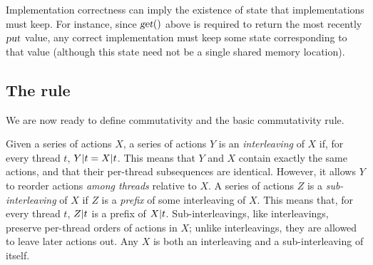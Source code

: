Implementation correctness can imply the existence of state
that implementations must keep.
%
For instance, since $\textsl{get}()$ above is required to return
the most recently $\textsl{put}$ value, any correct implementation must keep
some state corresponding to that value (although this state need not be
a single shared memory location).


\begin{comment}
\textbf{Nondeterminism.} We assume without loss of
generality${}^{\text{????}}$ that all operations have deterministic
return values. Of course, real operations often return nondeterministic
results. This can be modeled in various ways. For example, we might
model a nondeterministic action as returning a \emph{set} of values,
where the set contains all legal return values.
\XXX[AC][Do we need this, given that legality already accounts for
nondeterminism?]
\XXX[E][Yes, because commutativity doesn't say just that the scrambled
history is legal with SOME return values, we say that the scrambled
history is legal with THE SAME RETURN VALUES as in the original trace]
\XXX[AC][That's exactly my point.  Our definition \emph{already}
captures this, so why do we need to say something fuzzy about making
interface deterministic?  If we're going to say something about
nondeterminism, shouldn't we draw the reader's attention to how our
definitions capture it, rather than saying that they don't without
additional modeling?]
\XXX[E][I don't think it is your point but I don't think we actually need
to care about nondeterminism at this point in the doc]
\end{comment}

\subsection{The rule}
\label{rulerule}

We are now ready to define commutativity and the basic commutativity
rule.

Given a series of actions $X$,
a series of actions $Y$ is an
\emph{interleaving} of $X$ if, for every thread $t$,
$Y|t = X|t$.
%
This means that $Y$ and $X$ contain exactly the same actions, and that
their per-thread subsequences are identical. However, it allows $Y$ to
reorder actions \emph{among threads} relative to $X$.
%
A series of actions $Z$ is a \emph{sub-interleaving} of $X$ if $Z$ is a
\emph{prefix} of some interleaving of $X$.
%
This means that, for every thread $t$, $Z|t$ is a prefix of
$X|t$. Sub-interleavings, like interleavings, preserve per-thread
orders of actions in $X$; unlike interleavings, they are allowed to leave
later actions out.
%
Any $X$ is both an interleaving and a sub-interleaving of itself.

